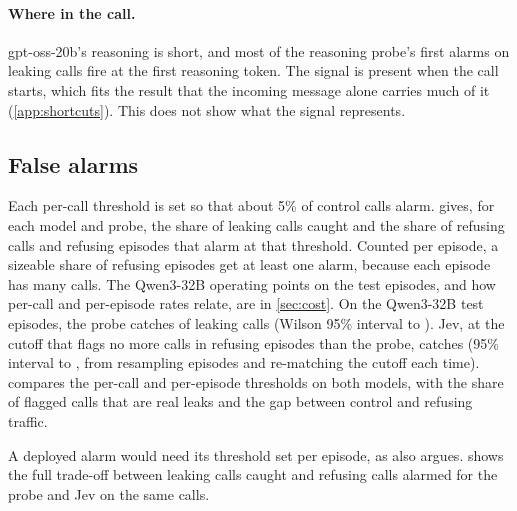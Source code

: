 \paragraph{Where in the call.}
gpt-oss-20b's reasoning is short, and most of the reasoning probe's first alarms on leaking calls fire at the first reasoning token.
The signal is present when the call starts, which fits the result that the incoming message alone carries much of it (\cref{app:shortcuts}).
This does not show what the signal represents.

\subsection{False alarms}
\label{app:alarms}

Each per-call threshold is set so that about 5\% of control calls alarm.
 gives, for each model and probe, the share of leaking calls caught and the share of refusing calls and refusing episodes that alarm at that threshold.
Counted per episode, a sizeable share of refusing episodes get at least one alarm, because each episode has many calls.
The Qwen3-32B operating points on the test episodes, and how per-call and per-episode rates relate, are in \cref{sec:cost}.
On the Qwen3-32B test episodes, the probe catches \qwenFreshProbeCaughtWilson{} of leaking calls (Wilson 95\% interval \qwenFreshProbeCaughtWilsonLow{} to \qwenFreshProbeCaughtWilsonHigh{}).
Jev, at the cutoff that flags no more calls in refusing episodes than the probe, catches \qwenMatchedJevCaught{} (95\% interval \qwenMatchedJevCaughtLow{} to \qwenMatchedJevCaughtHigh{}, from resampling episodes and re-matching the cutoff each time).
 compares the per-call and per-episode thresholds on both models, with the share of flagged calls that are real leaks and the gap between control and refusing traffic.

\begin{table}[h]
  \centering
  \small
  \setlength{\tabcolsep}{3pt}
  
  \caption{Per-call and per-episode thresholds on the test episodes: precision of the flagged calls, leaking episodes caught by their first leak, refusing episodes and calls flagged, and the same rates on control traffic. Recruiting calls come from leaking and refusing episodes; control calls come from control episodes and are counted separately. Jev's per-call row uses the cutoff that flags no more refusing calls than the probe. Precision counts every flagged recruiting call, including calls before the leak in leaking episodes, so its denominator is not the sum of the other columns.}
  \label{tab:episode-calibration}
\end{table}
A deployed alarm would need its threshold set per episode, as \citet{gao2026} also argues.
 shows the full trade-off between leaking calls caught and refusing calls alarmed for the probe and Jev on the same calls.

